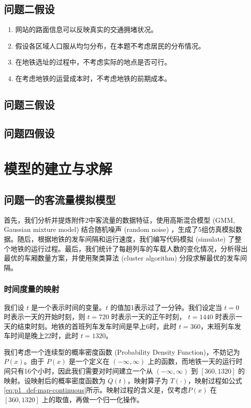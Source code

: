 \documentclass[12pt,a4paper]{mcmthesis}
\begin{document}
\subsection{问题二假设}
\begin{enumerate}
	\item 网站的路面信息可以反映真实的交通拥堵状况。
	\item 假设各区域人口服从均匀分布，在本题不考虑居民的分布情况。
	\item 在地铁选址的过程中，不考虑实际的地点是否可行。
	\item 在考虑地铁的运营成本时，不考虑地铁的前期成本。

\end{enumerate}

\subsection{问题三假设}
\subsection{问题四假设}

\section{模型的建立与求解}

\subsection{问题一的客流量模拟模型}

首先，我们分析并提炼附件2中客流量的数据特征，使用高斯混合模型 (GMM, Gaussian mixture model) 结合随机噪声 (random noise) ，生成了5组仿真模拟数据。随后，根据地铁的发车间隔和运行速度，我们编写代码模拟 (simulate) 了整个地铁的运行过程。最后，我们统计了每趟列车的车载人数的变化情况，分析得出最优的车厢数量方案，并使用聚类算法 (cluster algorithm) 分段求解最优的发车间隔。

\subsubsection{时间度量的映射}

我们设 $t$ 是一个表示时间的变量。$t$ 的值加1表示过了一分钟。我们设定当 $t=0$ 时表示一天的开始时刻，则 $t=720$ 时表示一天的正午时刻， $t=1440$ 时表示一天的结束时刻。地铁的首班列车发车时间是早上6时，此时 $t=360$，末班列车发车时间是晚上22时，此时 $t=1320$。

我们考虑一个连续型的概率密度函数 (Probability Density Function)，不妨记为 $P(x)$。由于 $P(x)$ 是一个定义在 $(-\infty,\infty)$ 上的函数，而地铁一天的运行时间只有16个小时，因此我们需要对时间建立一个从 $(-\infty,\infty)$ 到 $[360,1320]$ 的映射。设映射后的概率密度函数为 $Q(t)$，映射算子为 $T(\cdot)$，映射过程如公式\ref{eq:p1_def-map-continuous}所示。映射过程的含义是，仅考虑$P(x)$ 在 $[360,1320]$ 上的取值，再做一个归一化操作。
\end{document}
